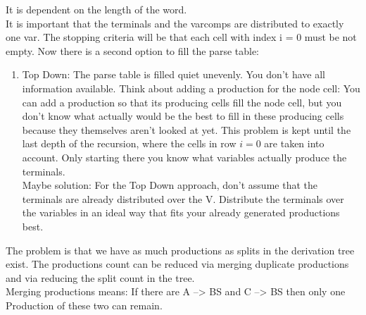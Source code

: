 It is dependent on the length of the word.\\
It is important that the terminals and the varcomps are distributed to exactly one var.
The stopping criteria will be that each cell with index i = 0 must be not empty.
Now there is a second option to fill the parse table:
\begin{enumerate}
	\item Top Down: The parse table is filled quiet unevenly. You don't have all information available. Think about adding a production for the node cell: You can add a production so that its producing cells fill the node cell, but you don't know what actually would be the best to fill in these producing cells because they themselves aren't looked at yet. This problem is kept until the last depth of the recursion, where the cells in row $i=0$ are taken into account. Only starting there you know what variables actually produce the terminals.\\
	Maybe solution: For the Top Down approach, don't assume that the terminals are already distributed over the V. Distribute the terminals over the variables in an ideal way that fits your already generated productions best.
\end{enumerate}
The problem is that we have as much productions as splits in the derivation tree exist. The productions count can be reduced via merging duplicate productions and via reducing the split count in the tree. \\
Merging productions means: If there are A --> BS and C --> BS then only one Production of these two can remain.\\

\pagebreak
\noindent
{}

\noindent
{}
\\


